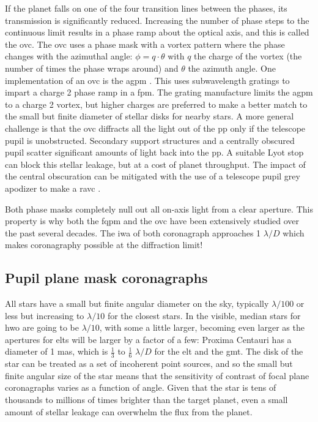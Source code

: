 \documentclass[letterpaper]{ar-1col}
\newcommand{\ld}{$\lambda/D$}
\begin{document}
If the planet falls on one of the four transition lines between the phases, its transmission is significantly reduced.
%
Increasing the number of phase steps to the continuous limit results in a phase ramp about the optical axis, and this is called the \ac{ovc}.
%
The \ac{ovc} uses a phase mask with a vortex pattern where the phase changes with the azimuthal angle: $\phi=q \cdot \theta$ with $q$ the charge of the vortex (the number of times the phase wraps around) and $\theta$ the azimuth angle.
%
One implementation of an \ac{ovc} is the \acl{agpm} \citep[\acs{agpm}; ][]{Mawet05b}.
%
This uses subwavelength gratings to impart a charge 2 phase ramp in a \ac{fpm}.
%
The grating manufacture limits the \ac{agpm} to a charge 2 vortex, but higher charges are preferred to make a better match to the small but finite diameter of stellar disks for nearby stars.
%
A more general challenge is that the \ac{ovc} diffracts all the light out of the \ac{pp} only if the telescope pupil is unobstructed.
%
Secondary support structures and a centrally obscured pupil scatter significant amounts of light back into the \ac{pp}.
%
A suitable Lyot stop can block this stellar leakage, but at a cost of planet throughput.
%
The impact of the central obscuration can be mitigated with the use of a telescope pupil grey apodizer to make a \acl{ravc} \citep[\acs{ravc}; ][]{Mawet13a}.

Both phase masks completely null out all on-axis light from a clear aperture.
%
This property is why both the \ac{fqpm} and the \ac{ovc} have been extensively studied over the past several decades.
%
The \ac{iwa} of both coronagraph approaches 1 \ld{} which makes coronagraphy possible at the diffraction limit!

\subsection{Pupil plane mask coronagraphs}

All stars have a small but finite angular diameter on the sky, typically $\lambda/100$ or less but increasing to $\lambda/10$ for the closest stars.
In the visible, median stars for \ac{hwo} are going to be $\lambda/10$, with some a little larger, becoming even larger as the apertures for \acp{elt} will be larger by a factor of a few: Proxima Centauri has a diameter of 1 mas, which is $\frac{1}{3}$ to $\frac{1}{6}$ \ld{} for the \ac{elt} and the \ac{gmt}.
%
The disk of the star can be treated as a set of incoherent point sources, and so the small but finite angular size of the star means that the sensitivity of contrast of focal plane coronagraphs varies as a function of angle.
%
Given that the star is tens of thousands to millions of times brighter than the target planet, even a small amount of stellar leakage can overwhelm the flux from the planet.
\end{document}
